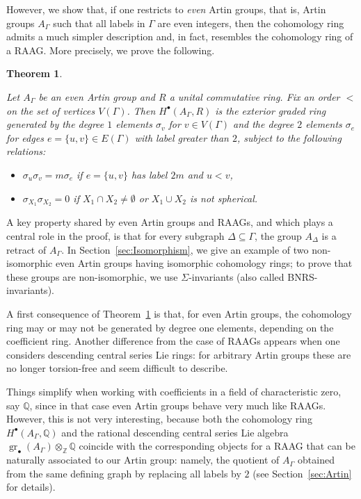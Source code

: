 \documentclass[10pt, oneside]{amsart}
\newcommand{\gr}{\operatorname{gr}} %
\theoremstyle{definition}
\theoremstyle{remark}
\theoremstyle{plain}
\newtheorem{teoInt}{Theorem}
\begin{document}
However, we show that, if one restricts to {\sl even} Artin groups, that is, Artin groups \(A_\Gamma\) such that all labels in \(\Gamma\) are even integers, then the cohomology ring admits a much simpler description and, in fact, resembles the cohomology ring of a RAAG. More precisely, we prove the following.

\begin{teoInt} \label{teo:CohomRing}
{\sl Let \(A_\Gamma\) be an even Artin group and \(R\) a unital commutative ring. Fix an order \(<\) on the set of vertices \(V(\Gamma)\). Then \(H^\bullet(A_\Gamma,R)\) is the exterior graded ring generated by the degree \(1\) elements \(\sigma_v\) for \(v\in V(\Gamma)\) and the degree \(2\) elements \(\sigma_e\) for edges \(e=\{u,v\}\in E(\Gamma)\) with label greater than \(2\), subject to the following relations:
\begin{itemize}
\item[(1)] \(\sigma_u\sigma_v=m\sigma_e\) if \(e=\{u,v\}\) has label \(2m\) and \(u<v\),
\item[(2)] \(\sigma_{X_1}\sigma_{X_2}=0\) if \(X_1\cap X_2\neq\emptyset\) or \(X_1\cup X_2\) is not spherical.
\end{itemize}}
\end{teoInt}

A key property shared by even Artin groups and RAAGs, and which plays a central role in the proof, is that for every subgraph \(\Delta\subseteq \Gamma\), the group \(A_\Delta\) is a retract of \(A_\Gamma\). In Section~\ref{sec:Isomorphism}, we give an example of two non-isomorphic even Artin groups having isomorphic cohomology rings; to prove that these groups are non-isomorphic, we use \(\Sigma\)-invariants (also called BNRS-invariants).


A first consequence of Theorem~\ref{teo:CohomRing} is that, for even Artin groups, the cohomology ring may or may not be generated by degree one elements, depending on the coefficient ring. Another difference from the case of RAAGs appears when one considers descending central series Lie rings: for arbitrary Artin groups these are no longer torsion-free and seem difficult to describe.

Things simplify when working with coefficients in a field of characteristic zero, say \(\mathbb{Q}\), since in that case even Artin groups behave very much like RAAGs. However, this is not very interesting, because both the cohomology ring \(H^\bullet(A_\Gamma,\mathbb{Q})\) and the rational descending central series Lie algebra \(\gr_\bullet(A_\Gamma)\otimes_\mathbb{Z}\mathbb{Q}\) coincide with the corresponding objects for a RAAG that can be naturally associated to our Artin group: namely, the quotient of \(A_\Gamma\) obtained from the same defining graph by replacing all labels by \(2\) (see Section~\ref{sec:Artin} for details).
\end{document}
